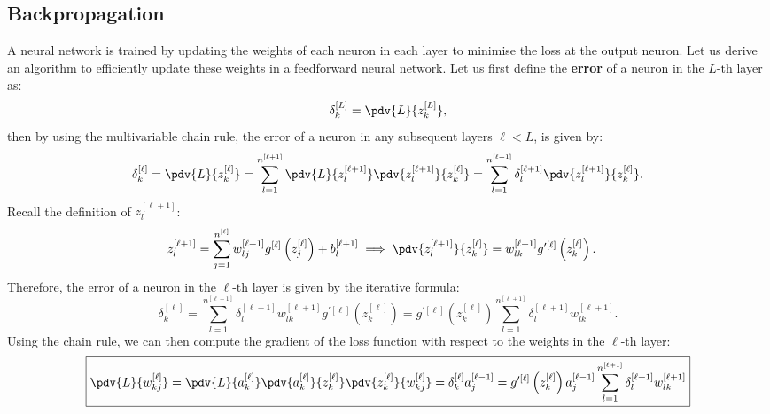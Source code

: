 \documentclass{article}
\begin{document}
\subsection{Backpropagation}
A neural network is trained by updating the weights of each neuron in
each layer to minimise the loss at the output neuron. Let us derive an
algorithm to efficiently update these weights in a feedforward neural
network. Let us first define the \textbf{error} of a neuron in the
\(L\)-th layer as:
\begin{equation*}
    \delta_k^{\left[ L \right]} = \pdv{L}{z_k^{\left[ L \right]}},
\end{equation*}
then by using the multivariable chain rule, the error of a neuron in any
subsequent layers \(\ell < L\), is given by:
\begin{equation*}
    \delta_k^{\left[ \ell \right]} = \pdv{L}{z_k^{\left[ \ell \right]}} = \sum_{l = 1}^{n^{\left[ \ell + 1 \right]}} \pdv{L}{z_{l}^{\left[ \ell + 1 \right]}} \pdv{z_{l}^{\left[ \ell + 1 \right]}}{z_k^{\left[ \ell \right]}} = \sum_{l = 1}^{n^{\left[ \ell + 1 \right]}} \delta_{l}^{\left[ \ell + 1 \right]} \pdv{z_{l}^{\left[ \ell + 1 \right]}}{z_k^{\left[ \ell \right]}}.
\end{equation*}
Recall the definition of \(z_{l}^{\left[ \ell + 1 \right]}\):
\begin{align*}
    z_{l}^{\left[ \ell + 1 \right]} & = \sum_{j = 1}^{n^{\left[ \ell \right]}} w_{l j}^{\left[ \ell + 1 \right]} g^{\left[ \ell \right]}\left( z_j^{\left[ \ell \right]}  \right) + b_{l}^{\left[ \ell + 1 \right]} \implies \pdv{z_{l}^{\left[ \ell + 1 \right]}}{z_k^{\left[ \ell \right]}} = w_{l k}^{\left[ \ell + 1 \right]} g^{\prime\left[ \ell \right]}\left( z_k^{\left[ \ell \right]} \right).
\end{align*}
Therefore, the error of a neuron in the \(\ell\)-th layer is given by
the iterative formula:
\begin{equation*}
    \delta_k^{\left[ \ell \right]} = \sum_{l = 1}^{n^{\left[ \ell + 1 \right]}} \delta_{l}^{\left[ \ell + 1 \right]} w_{l k}^{\left[ \ell + 1 \right]} g^{\prime\left[ \ell \right]}\left( z_k^{\left[ \ell \right]} \right) = g^{\prime\left[ \ell \right]}\left( z_k^{\left[ \ell \right]} \right) \sum_{l = 1}^{n^{\left[ \ell + 1 \right]}} \delta_{l}^{\left[ \ell + 1 \right]} w_{l k}^{\left[ \ell + 1 \right]}.
\end{equation*}
Using the chain rule, we can then compute the gradient of the loss
function with respect to the weights in the \(\ell\)-th layer:
\begin{equation*}
    \boxed{
    \pdv{L}{w_{kj}^{\left[ \ell \right]}} = \pdv{L}{a_k^{\left[ \ell \right]}} \pdv{a_k^{\left[ \ell \right]}}{z_k^{\left[ \ell \right]}} \pdv{z_k^{\left[ \ell \right]}}{w_{kj}^{\left[ \ell \right]}} = \delta_k^{\left[ \ell \right]} a_j^{\left[ \ell - 1 \right]} = g^{\prime\left[ \ell \right]}\left( z_k^{\left[ \ell \right]} \right) a_j^{\left[ \ell - 1 \right]} \sum_{l = 1}^{n^{\left[ \ell + 1 \right]}} \delta_{l}^{\left[ \ell + 1 \right]} w_{l k}^{\left[ \ell + 1 \right]}
    }
\end{equation*}
\end{document}
